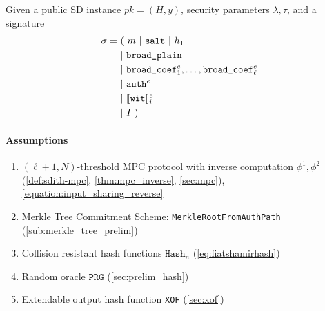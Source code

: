 \documentclass[11pt]{report}
\theoremstyle{definition}
\theoremstyle{plain}
\begin{document}
\begin{protocol}\label{def:sdith-verify}
  \setlength{\parindent}{0pt}
  \setlength{\parskip}{5pt}
  \titlespacing*{\paragraph}{0pt}{1pt}{1em}
  Given a public SD instance $pk = (H, y)$, security parameters $\lambda, \tau$, and a signature
  \begin{align*}
    \sigma = & \ (\ m\ |\ \texttt{salt}\ |\ h_1                                  \\
             & \ |\ \texttt{broad\_plain}                                        \\
             & \ |\ \texttt{broad\_coef}^e_1, \dots, \texttt{broad\_coef}^e_\ell \\
             & \ |\ \texttt{auth}^e                                              \\
             & \ |\ \sh{\texttt{wit}}_i^e                                        \\
             & \ |\ I\ )
  \end{align*}

  \paragraph{Assumptions}
  \begin{enumerate}[itemsep=0pt, topsep=0pt, parsep=0pt]
    \item $(\ell + 1, N)$-threshold MPC protocol with inverse computation $\phi^1, \phi^2$ (\autoref{def:sdith-mpc}, \autoref{thm:mpc_inverse}, \autoref{sec:mpc}), \autoref{equation:input_sharing_reverse}
    \item Merkle Tree Commitment Scheme: \texttt{MerkleRootFromAuthPath} (\autoref{sub:merkle_tree_prelim})
    \item Collision resistant  hash functions $\texttt{Hash}_n$ (\autoref{eq:fiatshamirhash})
    \item Random oracle $\texttt{PRG}$ (\autoref{sec:prelim_hash})
    \item Extendable output hash function \texttt{XOF} (\autoref{sec:xof})
  \end{enumerate}


\end{protocol}
\end{document}
